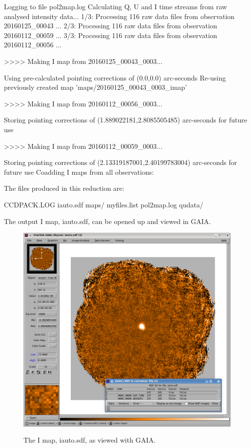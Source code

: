\begin{terminalv}
Logging to file pol2map.log
Calculating Q, U and I time streams from raw analysed intensity data...
   1/3: Processing 116 raw data files from observation 20160125_00043 ...
   2/3: Processing 116 raw data files from observation 20160112_00059 ...
   3/3: Processing 116 raw data files from observation 20160112_00056 ...

>>>>   Making I map from 20160125_00043_0003...

   Using pre-calculated pointing corrections of (0.0,0.0) arc-seconds
   Re-using previously created map 'maps/20160125_00043_0003_imap'

>>>>   Making I map from 20160112_00056_0003...

Storing pointing corrections of (1.889022181,2.8085505485) arc-seconds for future use

>>>>   Making I map from 20160112_00059_0003...

Storing pointing corrections of (2.13319187001,2.40199783004) arc-seconds for future use
Coadding I maps from all observations:
\end{terminalv}

The files produced in this reduction are:


\begin{terminalv}
CCDPACK.LOG  iauto.sdf  maps/  myfiles.list  pol2map.log  qudata/
\end{terminalv}

The output I map, iauto.sdf, can be opened up and viewed in GAIA.

\begin{figure}[t!]
\begin{center}
\includegraphics[width=0.8\linewidth]{sc22-gaia-view-iauto.png}
\label{fig:gaia-iauto}
\caption [I map in GAIA]{
  \small The I map, iauto.sdf, as viewed with GAIA.
}
\end{center}
\end{figure}

